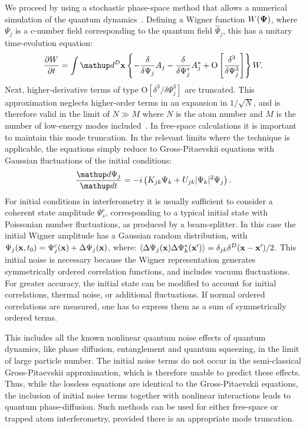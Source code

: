 We proceed by using a stochastic phase-space method that allows a numerical
simulation of the quantum dynamics~\cite{Drummond1993,Steel1998,Hoffmann2008}.
Defining a Wigner function $W(\mathbf{\Psi})$, where $\Psi_j$
is a c-number field corresponding to the quantum field $\hat{\Psi}_j$, this has a unitary time-evolution equation:
\begin{equation}
    \frac{\partial W}{\partial t} = \int \upd^D\xvec \left\{
        - \frac{\delta}{\delta\Psi_j} A_j
        - \frac{\delta}{\delta\Psi_j^*}A_j^*
        + \mbox{O} \left[ \frac{\delta^3}{\delta\Psi_j^3} \right]
    \right\} W.
\end{equation}
Next, higher-derivative terms of type $\mbox{O} \left[ \delta^3 / \delta\Psi_j^3 \right]$ are truncated.
This approximation neglects higher-order terms in an expansion in $1 / \sqrt{N}$,
and is therefore valid in the limit of $N \gg M$
where $N$ is the atom number and $M$ is the number of low-energy modes included~\cite{Drummond1993,Sinatra2002,Norrie2006}.
In free-space calculations it is important to maintain this mode truncation.
In the relevant limits where the technique is applicable, the equations
simply reduce to Gross-Pitaevskii equations with Gaussian fluctuations
of the initial conditions:
\begin{equation}
\label{eqn:SDE-1}
    \frac{\upd\Psi_j}{\upd t} = -i \left(
        K_{jk} \Psi_k + U_{jk} \lvert \Psi_k \rvert^2 \Psi_j
    \right).
\end{equation}
For initial conditions in interferometry it is usually sufficient to consider
a coherent state amplitude $\Psi_s^c$,
corresponding to a typical initial state with Poissonian number fluctuations,
as produced by a beam-splitter.
In this case the initial Wigner amplitude has a Gaussian random distribution, with
$\Psi_j(\mathbf{x}, t_0) = \Psi_j^c(\mathbf{x}) + \Delta \Psi_j(\mathbf{x})$, where:
$\left\langle \Delta \Psi_j(\mathbf{x}) \Delta \Psi_k^*(\mathbf{x}^{\prime}) \right\rangle =
\delta_{jk} \delta^D(\mathbf{x} - \mathbf{x}^{\prime}) / 2.$
This initial noise is necessary because the Wigner representation generates
symmetrically ordered correlation functions, and includes vacuum fluctuations.
For greater accuracy, the initial state can be modified to account for
initial  correlations, thermal noise, or additional fluctuations.
If normal ordered correlations are measured, one has to express them
as a sum of symmetrically ordered terms.

This includes all the known nonlinear quantum noise effects of quantum dynamics,
like phase diffusion, entanglement and quantum squeezing, in the limit
of large particle number.
The initial noise terms do not occur in the semi-classical Gross-Pitaevskii
approximation, which is therefore unable to predict these effects.
Thus, while the lossless equations are identical to the Gross-Pitaevskii
equations, the inclusion of initial noise terms together with nonlinear
interactions leads to quantum phase-diffusion.
Such methods can be used for either free-space or trapped atom interferometry,
provided there is an appropriate mode truncation.

